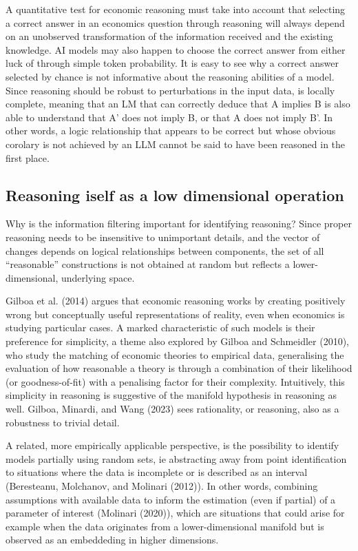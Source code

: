 \documentclass[
]{article}
\begin{document}
A quantitative test for economic reasoning must take into account that
selecting a correct answer in an economics question through reasoning
will always depend on an unobserved transformation of the information
received and the existing knowledge. AI models may also happen to choose
the correct answer from either luck of through simple token probability.
It is easy to see why a correct answer selected by chance is not
informative about the reasoning abilities of a model. Since reasoning
should be robust to perturbations in the input data, is locally
complete, meaning that an LM that can correctly deduce that A implies B
is also able to understand that A' does not imply B, or that A does not
imply B'. In other words, a logic relationship that appears to be
correct but whose obvious corolary is not achieved by an LLM cannot be
said to have been reasoned in the first place.

\subsection{Reasoning iself as a low dimensional
operation}\label{reasoning-iself-as-a-low-dimensional-operation}

Why is the information filtering important for identifying reasoning?
Since proper reasoning needs to be insensitive to unimportant details,
and the vector of changes depends on logical relationships between
components, the set of all ``reasonable'' constructions is not obtained
at random but reflects a lower-dimensional, underlying space.

Gilboa et al. (2014) argues that economic reasoning works by creating
positively wrong but conceptually useful representations of reality,
even when economics is studying particular cases. A marked
characteristic of such models is their preference for simplicity, a
theme also explored by Gilboa and Schmeidler (2010), who study the
matching of economic theories to empirical data, generalising the
evaluation of how reasonable a theory is through a combination of their
likelihood (or goodness-of-fit) with a penalising factor for their
complexity. Intuitively, this simplicity in reasoning is suggestive of
the manifold hypothesis in reasoning as well. Gilboa, Minardi, and Wang
(2023) sees rationality, or reasoning, also as a robustness to trivial
detail.

A related, more empirically applicable perspective, is the possibility
to identify models partially using random sets, ie abstracting away from
point identification to situations where the data is incomplete or is
described as an interval (Beresteanu, Molchanov, and Molinari (2012)).
In other words, combining assumptions with available data to inform the
estimation (even if partial) of a parameter of interest (Molinari
(2020)), which are situations that could arise for example when the data
originates from a lower-dimensional manifold but is observed as an
embeddeding in higher dimensions.
\end{document}
